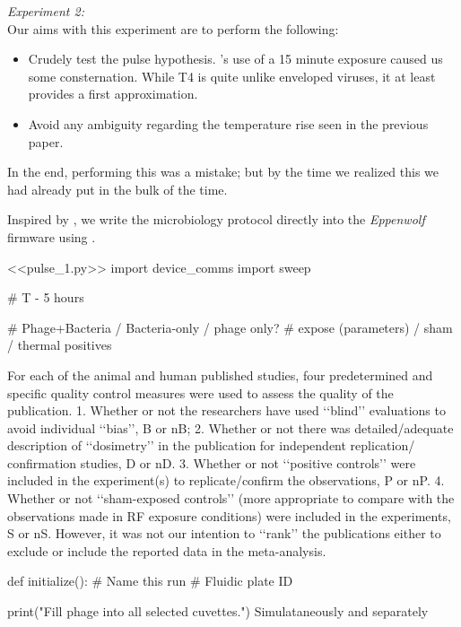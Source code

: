 \documentclass[paper.tex]{subfiles}%
\begin{document}
\clearpage
{\Large \it Experiment 2:}\\

\nwdocspar
Our aims with this experiment are to perform the following:

\begin{itemize}
\item Crudely test the pulse hypothesis. \cite{Efficient2015}'s use of a 15 minute exposure caused us some consternation.
    While T4 is quite unlike enveloped viruses, it at least provides a first approximation.
\item Avoid any ambiguity regarding the temperature rise seen in the previous paper.
\end{itemize}

In the end, performing this was a mistake; but by the time we realized this we had already put in the bulk of the time.



Inspired by \cite{Biocoder2010}, we write the microbiology protocol directly into the {\it Eppenwolf} firmware using \cite{Noweb}.



<<pulse_1.py>>
import device_comms
import sweep

\nwenddocs{}\nwdocspar


# T - 5 hours


# Phage+Bacteria / Bacteria-only / phage only?
# expose (parameters) / sham / thermal positives

For each of the animal and human published studies, four
predetermined and specific quality control measures were used to
assess the quality of the publication.
1. Whether or not the researchers have used ‘‘blind’’ evaluations to
avoid individual ‘‘bias’’, B or nB;
2. Whether or not there was detailed/adequate description of
‘‘dosimetry’’ in the publication for independent replication/
confirmation studies, D or nD.
3. Whether or not ‘‘positive controls’’ were included in the
experiment(s) to replicate/confirm the observations, P or nP.
4. Whether or not ‘‘sham-exposed controls’’ (more appropriate to
compare with the observations made in RF exposure conditions)
were included in the experiments, S or nS. However, it was not our
intention to ‘‘rank’’ the publications either to exclude or include
the reported data in the meta-analysis.

def initialize():
    # Name this run
    # Fluidic plate ID


    print("Fill phage into all selected cuvettes.")
    Simulataneously and separately
\end{document}
